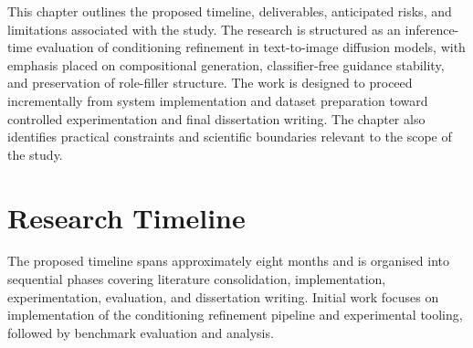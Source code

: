 \documentclass[a4paper,twoside,12pt]{report}
\begin{document}
This chapter outlines the proposed timeline, deliverables, anticipated risks, and limitations associated with the study. The research is structured as an inference-time evaluation of conditioning refinement in text-to-image diffusion models, with emphasis placed on compositional generation, classifier-free guidance stability, and preservation of role-filler structure. The work is designed to proceed incrementally from system implementation and dataset preparation toward controlled experimentation and final dissertation writing. The chapter also identifies practical constraints and scientific boundaries relevant to the scope of the study.

\section{Research Timeline}

The proposed timeline spans approximately eight months and is organised into sequential phases covering literature consolidation, implementation, experimentation, evaluation, and dissertation writing. Initial work focuses on implementation of the conditioning refinement pipeline and experimental tooling, followed by benchmark evaluation and analysis.
\end{document}
